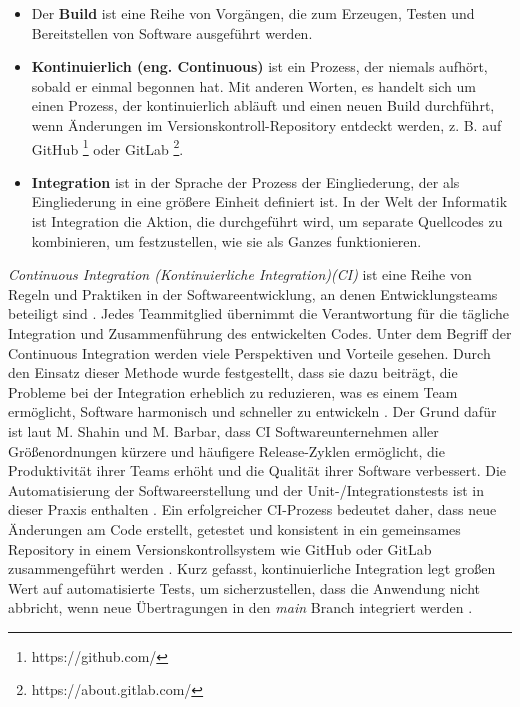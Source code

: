 \begin{itemize}
	\item Der \textbf{Build}  ist eine Reihe von Vorgängen, die zum Erzeugen, Testen und Bereitstellen von Software ausgeführt werden.
	
	\item \textbf{Kontinuierlich (eng. Continuous)} ist ein Prozess, der niemals aufhört, sobald er einmal begonnen hat. Mit anderen Worten, es handelt sich um einen Prozess, der kontinuierlich abläuft und einen neuen Build durchführt, wenn Änderungen im Versionskontroll-Repository entdeckt werden, z. B. auf GitHub \footnote{https://github.com/} oder GitLab \footnote{https://about.gitlab.com/}.
	
	\item \textbf{Integration} ist in der Sprache der Prozess der Eingliederung, der als Eingliederung in eine größere Einheit definiert ist. In der Welt der Informatik ist Integration die Aktion, die durchgeführt wird, um separate Quellcodes zu kombinieren, um festzustellen, wie sie als Ganzes funktionieren.
	
\end{itemize}
%
\textit{Continuous Integration (Kontinuierliche Integration)(CI)} ist eine Reihe von Regeln und Praktiken in der Softwareentwicklung, an denen Entwicklungsteams beteiligt sind \cite{Meyer2014}. Jedes Teammitglied übernimmt die Verantwortung für die tägliche Integration und Zusammenführung des entwickelten Codes. Unter dem Begriff der Continuous Integration werden viele Perspektiven und Vorteile gesehen. Durch den Einsatz dieser Methode wurde festgestellt, dass sie dazu beiträgt, die Probleme bei der Integration erheblich zu reduzieren, was es einem Team ermöglicht, Software harmonisch und schneller zu entwickeln \cite{Fowler2006}. Der Grund dafür ist laut M. Shahin und M. Barbar, dass CI Softwareunternehmen aller Größenordnungen kürzere und häufigere Release-Zyklen ermöglicht, die Produktivität ihrer Teams erhöht und die Qualität ihrer Software verbessert. Die Automatisierung der Softwareerstellung und der Unit-/Integrationstests ist in dieser Praxis enthalten \cite{Shahin2017}. Ein erfolgreicher CI-Prozess bedeutet daher, dass neue Änderungen am Code erstellt, getestet und konsistent in ein gemeinsames Repository in einem Versionskontrollsystem wie GitHub oder GitLab zusammengeführt werden \cite{RedHat2018}. Kurz gefasst, kontinuierliche Integration legt großen Wert auf automatisierte Tests, um sicherzustellen, dass die Anwendung nicht abbricht, wenn neue Übertragungen in den \textit{main} Branch integriert werden \cite{Atlassian}.

